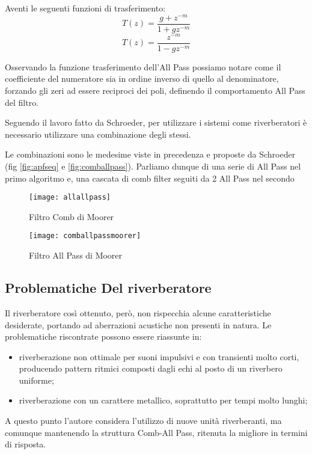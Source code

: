 Aventi le seguenti funzioni di trasferimento:
\begin{equation}
T(z) = \frac{g + z^{-m}}{1+gz^{-m}}
\end{equation}
\begin{equation}
T(z) = \frac{z^{-m}}{1-gz^{-m}}
\end{equation}

Osservando la funzione trasferimento dell’All Pass possiamo notare come il coefficiente del numeratore sia in ordine inverso di quello al denominatore, forzando gli zeri ad essere reciproci dei poli, definendo il comportamento All Pass del filtro.

Seguendo il lavoro fatto da Schroeder, per utilizzare i sistemi come riverberatori è necessario utilizzare una combinazione degli stessi.

Le combinazioni sono le medesime viste in precedenza e proposte da Schroeder (fig \ref{fig:apfseq} e \ref{fig:comballpass}). Parliamo dunque di una serie di All Pass nel primo algoritmo e, una cascata di comb filter seguiti da 2 All Pass nel secondo

\begin{figure}[htp]
\centering
\texttt{[image: allallpass]}
\caption{Filtro Comb di Moorer}
\label{fig:allallpass}
\texttt{[image: comballpassmoorer]}
\caption{Filtro All Pass di Moorer}
\label{fig:comballpassmoorerB}
\end{figure}

\subsection{Problematiche Del riverberatore}

Il riverberatore così ottenuto, però, non rispecchia alcune caratteristiche desiderate, portando ad aberrazioni acustiche non presenti in natura.
Le problematiche riscontrate possono essere riassunte in:

\begin{itemize}
\item riverberazione non ottimale per suoni impulsivi e con transienti molto corti, producendo pattern ritmici composti dagli echi al posto di un riverbero uniforme;
\item riverberazione con un carattere metallico, soprattutto per tempi molto lunghi;
\end{itemize}

A questo punto l’autore considera l’utilizzo di nuove unità riverberanti, ma comunque mantenendo la struttura Comb-All Pass, ritenuta la migliore in termini di risposta. 

